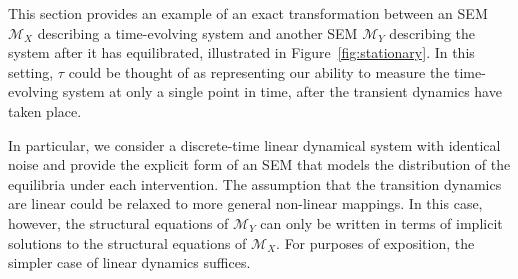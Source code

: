 This section provides an example of an exact transformation between an SEM $\mathcal{M}_X$ describing a time-evolving system and another SEM $\mathcal{M}_Y$ describing the system after it has equilibrated, illustrated in Figure~\ref{fig:stationary}. 
In this setting, $\tau$ could be thought of as representing our ability to measure the time-evolving system at only a single point in time, after the transient dynamics have taken place.

In particular, we consider a discrete-time linear dynamical system with identical noise and provide the explicit form of an SEM that models the distribution of the equilibria under each intervention.
The assumption that the transition dynamics are linear could be relaxed to more general non-linear mappings. 
In this case, however, the structural equations of $\mathcal{M}_Y$ can only be written in terms of implicit solutions to the structural equations of $\mathcal{M}_X$. 
For purposes of exposition, the simpler case of linear dynamics suffices.

